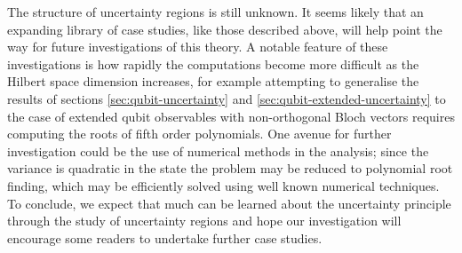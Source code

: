 The  structure of uncertainty regions is still unknown. It seems likely that an expanding library of case studies, like those described above, will help point the way for future investigations of this theory. A notable feature of these investigations is how rapidly the computations become more difficult as the Hilbert space dimension increases, for example attempting to generalise the results of sections \ref{sec:qubit-uncertainty} and \ref{sec:qubit-extended-uncertainty} to the case of extended qubit observables with non-orthogonal Bloch vectors requires computing the roots of fifth order polynomials. One avenue for further investigation could be the use of numerical methods in the analysis; since the variance is quadratic in the state the problem may be reduced to polynomial root finding, which may be efficiently solved using well known numerical techniques.
To conclude, we expect that much can be learned about the uncertainty principle through the study of uncertainty regions and hope our investigation will encourage some readers to undertake further case studies.

